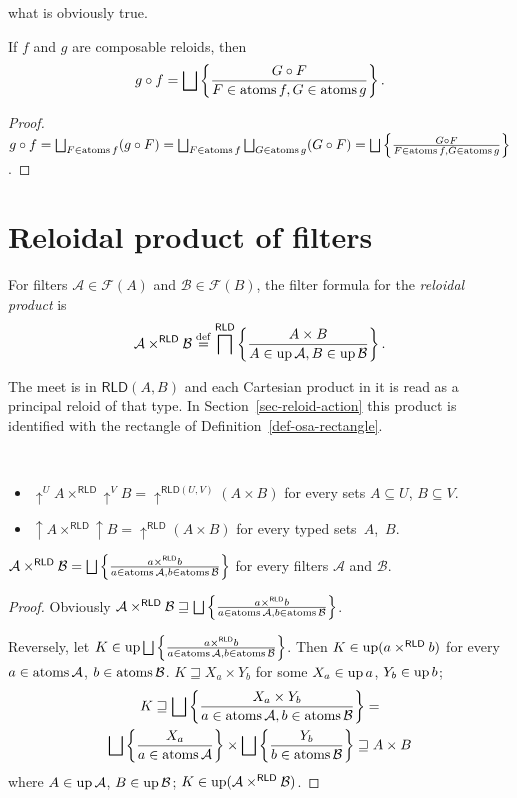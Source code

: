 what is obviously true.
\begin{cor}
\label{rld-comp-at}If $f$ and $g$ are composable reloids, then
\[
g\circ f=\bigsqcup\setcond{G\circ F}{F\in\atoms f,G\in\atoms g}.
\]
\end{cor}
\begin{proof}
$g\circ f=\bigsqcup_{F\in\atoms f}(g\circ F)=\bigsqcup_{F\in\atoms f}\bigsqcup_{G\in\atoms g}(G\circ F)=\bigsqcup\setcond{G\circ F}{F\in\atoms f,G\in\atoms g}$.
\end{proof}

\section{Reloidal product of filters}
\begin{defn}
For filters $\mathcal{A}\in\mathscr F(A)$
and $\mathcal{B}\in\mathscr F(B)$, the filter formula for the
\emph{reloidal product} is
\[
\mathcal{A}\times^{\mathsf{RLD}}\mathcal{B}\overset{\mathrm{def}}{=}\bigsqcap^{\mathsf{RLD}}\left\{ \frac{A\times B}{A\in\operatorname{up}\mathcal{A},B\in\operatorname{up}\mathcal{B}}\right\}.
\]
\end{defn}
The meet is in $\mathsf{RLD}(A,B)$ and each Cartesian product in
it is read as a principal reloid of that type. In
Section~\ref{sec-reloid-action} this product is identified with the
rectangle of Definition~\ref{def-osa-rectangle}.
\begin{obvious}
~
\begin{itemize}
\item $\uparrow^{U}A\times^{\mathsf{RLD}}\uparrow^{V}B=\uparrow^{\mathsf{RLD}(U,V)}(A\times B)$
for every sets $A\subseteq U$, $B\subseteq V$.
\item $\uparrow A\times^{\mathsf{RLD}}\uparrow B=\uparrow^{\mathsf{RLD}}(A\times B)$
for every typed sets~$A$,~$B$.\end{itemize}
\end{obvious}
\begin{thm}
\label{rld-prod-t-atoms}$\mathcal{A}\times^{\mathsf{RLD}}\mathcal{B}=\bigsqcup\setcond{a\times^{\mathsf{RLD}}b}{a\in\atoms\mathcal{A},b\in\atoms\mathcal{B}}$
for every filters $\mathcal{A}$ and $\mathcal{B}$.\end{thm}
\begin{proof}
Obviously $\mathcal{A}\times^{\mathsf{RLD}}\mathcal{B}\sqsupseteq\bigsqcup\setcond{a\times^{\mathsf{RLD}}b}{a\in\atoms\mathcal{A},b\in\atoms\mathcal{B}}$.

Reversely, let $K\in\up\bigsqcup\setcond{a\times^{\mathsf{RLD}}b}{a\in\atoms\mathcal{A},b\in\atoms\mathcal{B}}$.
Then $K\in\operatorname{up}(a\times^{\mathsf{RLD}}b)$ for every $a\in\operatorname{atoms}\mathcal{A}$,
$b\in\operatorname{atoms}\mathcal{B}$. $K\sqsupseteq X_{a}\times Y_{b}$ for some
$X_{a}\in\operatorname{up} a$, $Y_{b}\in\operatorname{up} b$; 
\begin{multline*}
K\sqsupseteq\bigsqcup\setcond{X_{a}\times Y_{b}}{a\in\atoms\mathcal{A},b\in\atoms\mathcal{B}}=\\
\bigsqcup\setcond{X_{a}}{a\in\atoms\mathcal{A}}\times\bigsqcup\setcond{Y_{b}}{b\in\atoms\mathcal{B}}\sqsupseteq A\times B
\end{multline*}
 where $A\in\operatorname{up}\mathcal{A}$, $B\in\operatorname{up}\mathcal{B}$; $K\in\operatorname{up}(\mathcal{A}\times^{\mathsf{RLD}}\mathcal{B})$.\end{proof}
